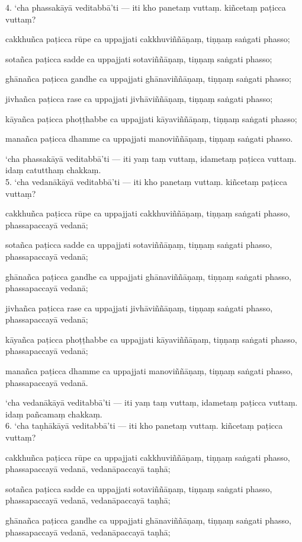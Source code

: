 \documentclass[11pt]{article}
\begin{document}
4. ‘cha phassakāyā veditabbā’ti — iti kho panetaṃ vuttaṃ. kiñcetaṃ paṭicca vuttaṃ?\

cakkhuñca paṭicca rūpe ca uppajjati cakkhuviññāṇaṃ, tiṇṇaṃ saṅgati phasso;\

sotañca paṭicca sadde ca uppajjati sotaviññāṇaṃ, tiṇṇaṃ saṅgati phasso;\

ghānañca paṭicca gandhe ca uppajjati ghānaviññāṇaṃ, tiṇṇaṃ saṅgati phasso;\

jivhañca paṭicca rase ca uppajjati jivhāviññāṇaṃ, tiṇṇaṃ saṅgati phasso;\

kāyañca paṭicca phoṭṭhabbe ca uppajjati kāyaviññāṇaṃ, tiṇṇaṃ saṅgati phasso;\

manañca paṭicca dhamme ca uppajjati manoviññāṇaṃ, tiṇṇaṃ saṅgati phasso.\

‘cha phassakāyā veditabbā’ti — iti yaṃ taṃ vuttaṃ, idametaṃ paṭicca vuttaṃ. idaṃ catutthaṃ chakkaṃ.\\

5. ‘cha vedanākāyā veditabbā’ti — iti kho panetaṃ vuttaṃ. kiñcetaṃ paṭicca vuttaṃ?\

cakkhuñca paṭicca rūpe ca uppajjati cakkhuviññāṇaṃ, tiṇṇaṃ saṅgati phasso, phassapaccayā vedanā;\

sotañca paṭicca sadde ca uppajjati sotaviññāṇaṃ, tiṇṇaṃ saṅgati phasso, phassapaccayā vedanā;\

ghānañca paṭicca gandhe ca uppajjati ghānaviññāṇaṃ, tiṇṇaṃ saṅgati phasso, phassapaccayā vedanā;\

jivhañca paṭicca rase ca uppajjati jivhāviññāṇaṃ, tiṇṇaṃ saṅgati phasso, phassapaccayā vedanā;\

kāyañca paṭicca phoṭṭhabbe ca uppajjati kāyaviññāṇaṃ, tiṇṇaṃ saṅgati phasso, phassapaccayā vedanā;\

manañca paṭicca dhamme ca uppajjati manoviññāṇaṃ, tiṇṇaṃ saṅgati phasso, phassapaccayā vedanā.\

‘cha vedanākāyā veditabbā’ti — iti yaṃ taṃ vuttaṃ, idametaṃ paṭicca vuttaṃ. idaṃ pañcamaṃ chakkaṃ.\\

6. ‘cha taṇhākāyā veditabbā’ti — iti kho panetaṃ vuttaṃ. kiñcetaṃ paṭicca vuttaṃ?\

cakkhuñca paṭicca rūpe ca uppajjati cakkhuviññāṇaṃ, tiṇṇaṃ saṅgati phasso, phassapaccayā vedanā, vedanāpaccayā taṇhā;\

sotañca paṭicca sadde ca uppajjati sotaviññāṇaṃ, tiṇṇaṃ saṅgati phasso, phassapaccayā vedanā, vedanāpaccayā taṇhā;\

ghānañca paṭicca gandhe ca uppajjati ghānaviññāṇaṃ, tiṇṇaṃ saṅgati phasso, phassapaccayā vedanā, vedanāpaccayā taṇhā;\
\end{document}
